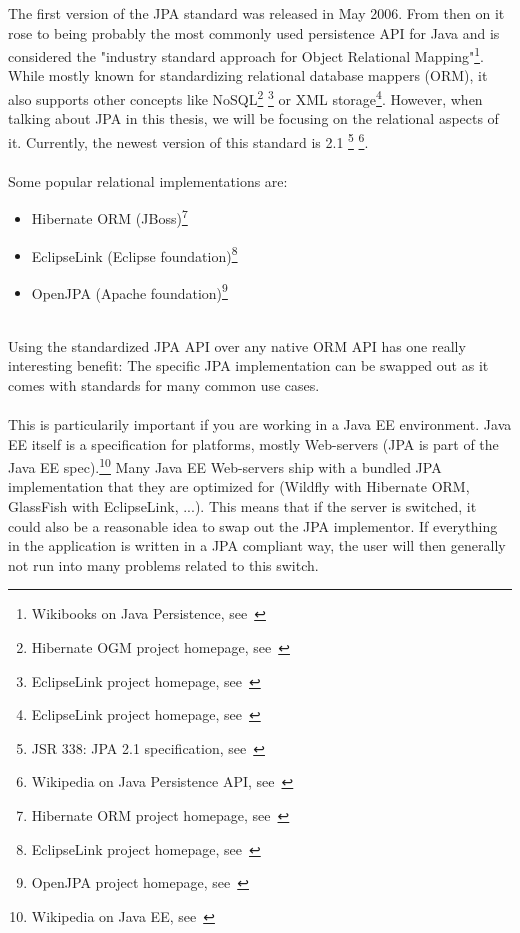 The first version of the JPA standard was released in May 2006. From then on it rose to being probably the most commonly used persistence API for Java and is considered the "industry standard approach for Object Relational Mapping"\footnote{Wikibooks on Java Persistence, see~\cite{wikibooks_on_jpa}}. While mostly known for standardizing relational database mappers (ORM), it also supports other concepts like NoSQL\footnote{Hibernate OGM project homepage, see~\cite{hibernate_ogm}} \footnote{EclipseLink project homepage, see~\cite{eclipselink}} or XML storage\footnote{EclipseLink project homepage, see~\cite{eclipselink}}. However, when talking about JPA in this thesis, we will be focusing on the relational aspects of it. Currently, the newest version of this standard is 2.1 \footnote{JSR 338: JPA 2.1 specification, see~\cite{jpa_21_jcp}} \footnote{Wikipedia on Java Persistence API, see~\cite{wiki_jpa}}.
\\\\
Some popular relational implementations are:
\begin{itemize}
	\item Hibernate ORM (JBoss)\footnote{Hibernate ORM project homepage, see~\cite{hibernate_orm}}
	\item EclipseLink (Eclipse foundation)\footnote{EclipseLink project homepage, see~\cite{eclipselink}}
	\item OpenJPA (Apache foundation)\footnote{OpenJPA project homepage, see~\cite{openjpa}}
\end{itemize}
~\\
Using the standardized JPA API over any native ORM API has one really interesting benefit:
The specific JPA implementation can be swapped out as it comes with standards for many common use cases.
\\\\
This is particularily important if you are working in a Java EE environment. Java EE itself is a specification for platforms, mostly Web-servers (JPA is part of the Java EE spec).\footnote{Wikipedia on Java EE, see~\cite{wiki_java_ee}} Many Java EE Web-servers ship with a bundled JPA implementation that they are optimized for (Wildfly with Hibernate ORM, GlassFish with EclipseLink, ...). This means that if the server is switched, it could also be a reasonable idea to swap out the JPA implementor. If everything in the application is written in a JPA compliant way, the user will then generally not run into many problems related to this switch.

\pagebreak

